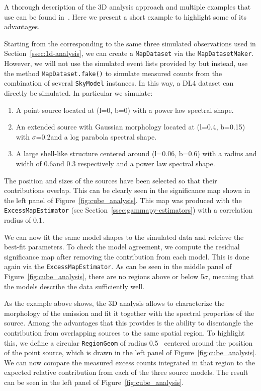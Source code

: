 \documentclass[traditabstract, longauth]{aa}
\newcommand{\code}[1]{\texttt{#1}}
\begin{document}
A thorough description of the 3D analysis approach and multiple examples that
use \gammapy can be found in~\cite{Mohrmann2019}. Here we present a short
example to highlight some of its advantages.

Starting from the \irfs corresponding to the same three simulated \cta
observations used in Section~\ref{ssec:1d-analysis}, we can create a \code{MapDataset}
via the \code{MapDatasetMaker}. However, we will not use the simulated event lists
provided by \cta but instead, use the method \code{MapDataset.fake()} to simulate
measured counts from the combination of several \code{SkyModel} instances. In this
way, a DL4 dataset can directly be simulated. In particular we simulate:

\begin{enumerate}
    \item A point source located at (l=0\textdegree, b=0\textdegree) with a power law
	      spectral shape.
    \item An extended source with Gaussian morphology located at (l=0.4\textdegree,
	      b=0.15\textdegree) with $\sigma$=0.2\textdegree and a log parabola spectral
	      shape.
    \item A large shell-like structure centered around (l=0.06\textdegree,
	      b=0.6\textdegree) with a radius and width of 0.6\textdegree and 0.3\textdegree
	      respectively and a power law spectral shape.
\end{enumerate}

The position and sizes of the sources
have been selected so that their contributions overlap. This can be clearly
seen in the significance map shown in the left panel of
Figure~\ref{fig:cube_analysis}. This map was produced with the
\code{ExcessMapEstimator} (see Section~\ref{ssec:gammapy-estimators}) with a
correlation radius of 0.1\textdegree.

We can now fit the same model shapes to the simulated data and retrieve the
best-fit parameters. To check the model agreement, we compute the residual
significance map after removing the contribution from each model. This is done
again via the \code{ExcessMapEstimator}. As can be seen in the middle panel of
Figure~\ref{fig:cube_analysis}, there are no regions above or below 5$\sigma$,
meaning that the models describe the data sufficiently well.

As the example above shows, the 3D analysis allows to characterize the
morphology of the emission and fit it together with the spectral properties of
the source.  Among the advantages that this provides is the ability to
disentangle the contribution from overlapping sources to the same spatial
region. To highlight this, we define a circular \code{RegionGeom} of radius
0.5\textdegree~ centered around the position of the point source, which is drawn
in the left panel of Figure~\ref{fig:cube_analysis}. We can now compare the
measured excess counts integrated in that region to the expected relative
contribution from each of the three source models. The result can be seen in the left
panel of Figure~\ref{fig:cube_analysis}.
\end{document}
